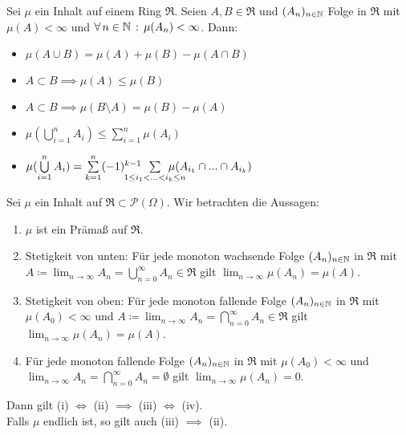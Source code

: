 \documentclass{cheat-sheet}
\newcommand{\Ring}{\mathfrak{R}} %
\begin{document}
\begin{lem}
  Sei $\mu$ ein Inhalt auf einem Ring $\Ring$. Seien $A, B \in \Ring$ und $(A_n)_{n \in \mathbb{N}}$ Folge in $\Ring$ mit $\mu(A) < \infty$ und $\forall \, {n \in \mathbb{N}} \,:\, \mu(A_n) < \infty$. Dann:
  \begin{itemize}
    \item $\mu(A \cup B) = \mu(A) + \mu(B) - \mu(A \cap B)$
    \item $A \subset B \implies \mu(A) \leq \mu(B)$ 
    \item $A \subset B \implies \mu(B \setminus A) = \mu(B) - \mu(A)$
    \item $\mu(\bigcup_{i=1}^n A_i) \leq \sum_{i=1}^n \mu(A_i)$ 
    \item $\mu(\bigcup_{i=1}^n A_i) = \sum_{k=1}^n (-1)^{k{-}1} \enspace \sum_{\mathclap{1 \leq i_1 < ... < i_k \leq n}} \enspace \mu(A_{i_1} \cap ... \cap A_{i_k})$
  \end{itemize}
\end{lem}

\begin{satz}
  Sei $\mu$ ein Inhalt auf $\Ring \subset \mathcal{P}(\Omega)$. Wir betrachten die Aussagen:

  \begin{enumerate}[label=(\roman*),leftmargin=2em]
    \item $\mu$ ist ein Prämaß auf $\Ring$.
    \item Stetigkeit von unten: Für jede monoton wachsende Folge $(A_n)_{n \in \mathbb{N}}$ in $\Ring$ mit $A \coloneqq \lim_{n \to \infty} A_n = \bigcup_{n = 0}^\infty A_n \in \Ring$ gilt $\lim_{n \to \infty} \mu(A_n) = \mu(A)$.
    \item Stetigkeit von oben: Für jede monoton fallende Folge $(A_n)_{n \in \mathbb{N}}$ in $\Ring$ mit $\mu(A_0) < \infty$ und $A \coloneqq \lim_{n \to \infty} A_n = \bigcap_{n = 0}^\infty A_n \in \Ring$ gilt $\lim_{n \to \infty} \mu(A_n) = \mu(A)$.
    \item Für jede monoton fallende Folge $(A_n)_{n \in \mathbb{N}}$ in $\Ring$ mit $\mu(A_0) < \infty$ und $\lim_{n \to \infty} A_n = \bigcap_{n = 0}^\infty A_n = \emptyset$ gilt $\lim_{n \to \infty} \mu(A_n) = 0$.
  \end{enumerate}

  Dann gilt (i) $\iff$ (ii) $\implies$ (iii) $\iff$ (iv).\\
  Falls $\mu$ endlich ist, so gilt auch (iii) $\implies$ (ii).
\end{satz}
\end{document}
